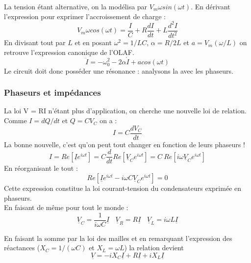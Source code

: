\documentclass	[11pt, a4paper, openany]{book}
\begin{document}
La tension étant alternative, on la modélisa par $V_m\omega sin(\omega t)$. En dérivant l'expression pour exprimer l'accroissement de charge : 
\begin{equation}
V_m\omega cos(\omega t) = \frac{I}{C} + R\frac{dI}{dt} + L\frac{d^2I}{dt^2}
\end{equation}
En divisant tout par $L$ et en posant $\omega^2 = 1/LC$, $\alpha = R/2L$ et $a = V_m(\omega/L)$ on retrouve l'expression canonique de l'OLAF.
\begin{equation}
\ddot{I} = -\omega_0^2 - 2\alpha\dot{I} + a cos(\omega t)
\end{equation}
Le circuit doit donc posséder une résonance : analysons la avec les phaseurs.

\subsubsection{Phaseurs et impédances}
La loi V = RI n'étant plus d'application, on cherche une nouvelle loi de relation. Comme $I = dQ/dt$ et $Q = CV_C$ on a :
\begin{equation}
I = C\frac{dV_C}{dt}
\end{equation}
La bonne nouvelle, c'est qu'on peut tout changer en fonction de leurs phaseurs ! 
\begin{equation}
I = Re\left[\underline{I}e^{i\omega t} \right] = C\frac{d}{dt}Re\left[\underline{V}_Ce^{i\omega t} \right] = C\ Re\left[i\omega\underline{V}_Ce^{i\omega t} \right]
\end{equation}
En réorganisant le tout :
\begin{equation}
Re\left[\underline{I}e^{i\omega t} - i\omega C\underline{V}_C e^{i\omega t} \right] = 0
\end{equation}
Cette expression constitue la loi courant-tension du condensateurs exprimée en phaseurs.\\

En faisant de même pour tout le monde : 
\begin{equation}
\underline{V}_C = \frac{1}{i\omega C}\underline{I}\ \ \ \ \underline{V}_R = R\underline{I}\ \ \ \ \underline{V}_L = i\omega L\underline{I}
\end{equation}

En faisant la somme par la loi des mailles et en remarquant l'expression des réactances ($X_C = 1/(\omega C)$ et $X_L = \omega L$) la relation devient
\begin{equation}
\underline{V} = -iX_C\underline{I} + R\underline{I} + iX_L\underline{I}
\end{equation}
\end{document}
